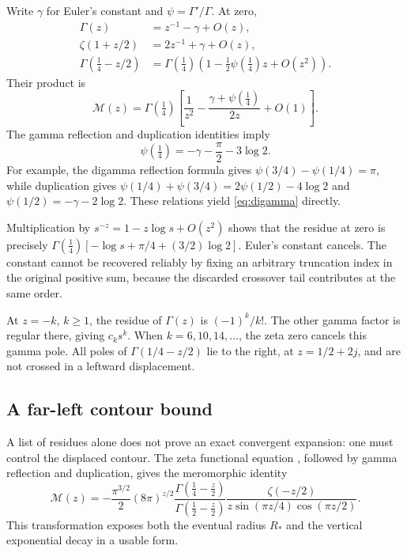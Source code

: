 \documentclass[11pt,a4paper]{article}
\numberwithin{equation}{section}
\theoremstyle{definition}
\newcommand{\gfour}{\Gamma(\tfrac14)}
\begin{document}
Write $\gamma$ for Euler's constant and $\psi=\Gamma'/\Gamma$.
At zero,
\begin{align*}
 \Gamma(z)&=z^{-1}-\gamma+O(z),\\
 \zeta(1+z/2)&=2z^{-1}+\gamma+O(z),\\
 \Gamma(\tfrac14-z/2)&=\gfour
           \left(1-\tfrac12\psi(\tfrac14)z+O(z^2)\right).
\end{align*}
Their product is
\begin{equation}
 \mathcal M(z)=\gfour
 \left[\frac1{z^2}-\frac{\gamma+\psi(\tfrac14)}{2z}+O(1)\right].
 \label{eq:doublepole}
\end{equation}
The gamma reflection and duplication identities \cite{DLMFgamma} imply
\begin{equation}
 \psi(\tfrac14)=-\gamma-\frac\pi2-3\log2.
 \label{eq:digamma}
\end{equation}
For example, the digamma reflection formula gives
$\psi(3/4)-\psi(1/4)=\pi$, while duplication gives
$\psi(1/4)+\psi(3/4)=2\psi(1/2)-4\log2$ and
$\psi(1/2)=-\gamma-2\log2$. These relations yield
\eqref{eq:digamma} directly.

Multiplication by $s^{-z}=1-z\log s+O(z^2)$ shows that the residue at
zero is precisely
$\gfour[-\log s+\pi/4+(3/2)\log2]$. Euler's constant cancels. The
constant cannot be recovered reliably by fixing an arbitrary truncation
index in the original positive sum, because the discarded crossover
tail contributes at the same order.

At $z=-k$, $k\ge1$, the residue of $\Gamma(z)$ is $(-1)^k/k!$.
The other gamma factor is regular there, giving $c_k s^k$.
When $k=6,10,14,\ldots$, the zeta zero cancels this gamma pole.
All poles of $\Gamma(1/4-z/2)$ lie to the right, at
$z=1/2+2j$, and are not crossed in a leftward displacement.

\subsection{A far-left contour bound}

A list of residues alone does not prove an exact convergent expansion:
one must control the displaced contour. The zeta functional equation
\cite{DLMFzeta}, followed by gamma reflection and duplication, gives
the meromorphic identity
\begin{equation}
 \mathcal M(z)=
 -\frac{\pi^{3/2}}2(8\pi)^{z/2}
 \frac{\Gamma(\frac14-\frac z2)}{\Gamma(\frac12-\frac z2)}
 \frac{\zeta(-z/2)}{z\sin(\pi z/4)\cos(\pi z/2)}.
 \label{eq:functionalM}
\end{equation}
This transformation exposes both the eventual radius $R_*$ and the
vertical exponential decay in a usable form.
\end{document}
